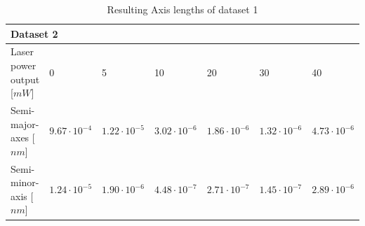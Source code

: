 \begin{table}[]
\caption{Resulting Axis lengths of dataset 1}
\label{tab:axis-results-two}
\begin{tabular}{|l|l|l|l|l|l|l|}
    \hline
    \multicolumn{7}{|l|}{Dataset 2}                                                                                         \\ \hline
    Laser power output [$mW$] & 0 &5 & 10   & 20   & 30   & 40\\ \hline
    Semi-major-axes [$nm$]   & $9.67 \cdot 10^{-4}$ & $1.22\cdot 10^{-5}$ & $3.02\cdot 10^{-6}$ & $1.86\cdot 10^{-6}$ & $1.32\cdot 10^{-6}$ & $4.73\cdot 10^{-6}$ \\ \hline
    Semi-minor-axis [$nm$]   & $1.24 \cdot 10^{-5}$ & $1.90\cdot 10^{-6}$ & $4.48\cdot 10^{-7}$ & $2.71\cdot 10^{-7}$ & $1.45\cdot 10^{-7}$ & $2.89\cdot 10^{-6}$ \\ \hline
\end{tabular}
\end{table}
